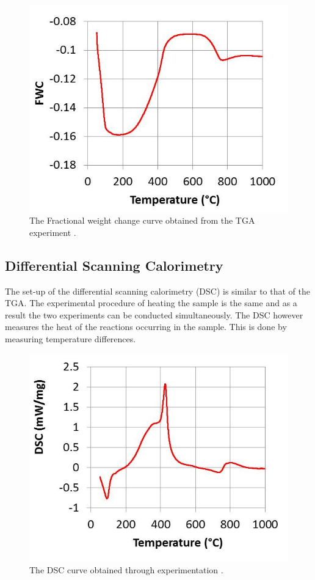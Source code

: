 \begin{figure}[h!]
\centering
\includegraphics[scale=1]{figures/TGA_exp.jpg}
\caption{The Fractional weight change curve obtained from the TGA experiment \cite{Ray19}.}
\label{TGA_exp}
\end{figure} 
\subsection{Differential Scanning Calorimetry}
The set-up of the differential scanning calorimetry (DSC) is similar to that of the TGA. The experimental procedure of heating the sample is the same and as a result the two experiments can be conducted simultaneously. The DSC however measures the heat of the reactions occurring in the sample. This is done by measuring temperature differences\cite{thermal}.\\  
\begin{figure}
\centering
\includegraphics[scale=1]{figures/DSC_exp.jpg}
\caption{The DSC curve obtained through experimentation \cite{Ray19}.}
\label{DSC_exp}
\end{figure} 
